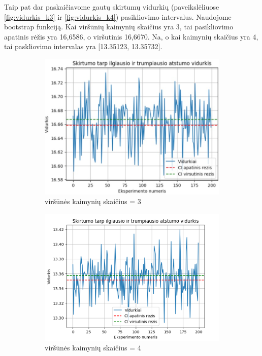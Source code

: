 \documentclass[bibliography=totoc]{article}
\begin{document}
Taip pat dar paskaičiavome gautų skirtumų vidurkių (paveikslėliuose \ref{fig:vidurkis_k3} ir \ref{fig:vidurkis_k4}) pasikliovimo intervalus. Naudojome bootstrap funkciją. Kai viršūnių kaimynių skaičius yra 3, tai pasikliovimo apatinis rėžis yra 16,6586, o viršutinis 16,6670. Na, o kai kaimynių skaičius yra 4, tai paskliovimo intervalas yra [13.35123, 13.35732]. 


\begin{figure}[h]
\centering
\begin{subfigure}{.5\textwidth}
  \centering
  \includegraphics[scale = .53]{CI_k3.png}
    \caption{viršūnės kaimynių skaičius = 3}
  \label{CI_k3}
\end{subfigure}%
\begin{subfigure}{.5\textwidth}
  \centering
  \includegraphics[scale = .8]{CI_k4.png}
    \caption{viršūnės kaimynių skaičius = 4}
  \label{fig:CI_k4}
\end{subfigure}
\caption{}
\end{figure}
\end{document}
